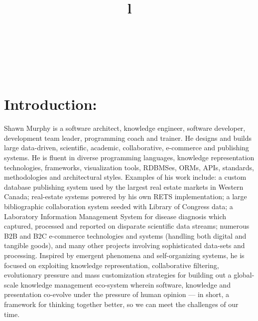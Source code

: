 \resumewidth=7in
\begin{resume}


\begin{format}
\title{l}\\
\\
\body\\
\end{format}


\section{Introduction:}
\begin{par}

Shawn Murphy is a software architect, knowledge engineer,
software developer, development team leader, programming coach
and trainer.
He designs and builds large data-driven, scientific, academic, 
collaborative, e-commerce and publishing systems. 
He is fluent in diverse programming languages, knowledge
representation technologies, frameworks, visualization tools, RDBMSes,
ORMs, APIs, standards, methodologies and architectural styles. 
Examples of his work include:
  a custom database publishing system used by the largest real estate
    markets in Western Canada;
  real-estate systems powered by his own RETS implementation; 
  a large bibliographic collaboration system seeded with Library of Congress data; 
  a Laboratory Information Management System for disease diagnosis which 
    captured, processed and reported on disparate scientific data streams; 
  numerous B2B and B2C e-commerce technologies and systems 
    (handling both digital and tangible goods), 
  and many other projects involving sophisticated data-sets and processing. 
Inspired by emergent phenomena and
self-organizing systems, he is focused on exploiting knowledge
representation, collaborative filtering, evolutionary pressure and
mass customization strategies for building out a global-scale
knowledge management eco-system wherein software, knowledge and presentation
co-evolve under the pressure of human opinion --– in short, a framework for 
thinking together better, so we can meet the challenges of our time.

\end{par}






\end{resume}
